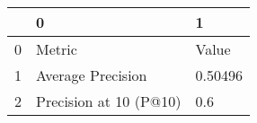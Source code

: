 \begin{tabular}{lll}
\toprule
{} &                       0 &        1 \\
\midrule
0 &                  Metric &    Value \\
1 &       Average Precision &  0.50496 \\
2 &  Precision at 10 (P@10) &      0.6 \\
\bottomrule
\end{tabular}
